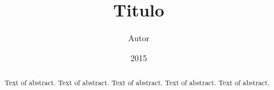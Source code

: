 
\title{Titulo}

\author{Autor}
\date{2015}


\begin{abstract}
Text of abstract. Text of abstract. Text of abstract. Text of abstract. Text of abstract. 
\end{abstract}